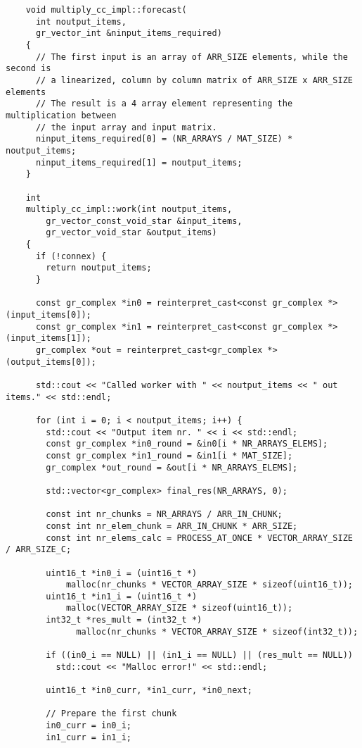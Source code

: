 \begin{lstlisting}
    void multiply_cc_impl::forecast(
      int noutput_items,
      gr_vector_int &ninput_items_required)
    {
      // The first input is an array of ARR_SIZE elements, while the second is
      // a linearized, column by column matrix of ARR_SIZE x ARR_SIZE elements
      // The result is a 4 array element representing the multiplication between
      // the input array and input matrix.
      ninput_items_required[0] = (NR_ARRAYS / MAT_SIZE) * noutput_items;
      ninput_items_required[1] = noutput_items;
    }

    int
    multiply_cc_impl::work(int noutput_items,
        gr_vector_const_void_star &input_items,
        gr_vector_void_star &output_items)
    {
      if (!connex) {
        return noutput_items;
      }

      const gr_complex *in0 = reinterpret_cast<const gr_complex *>(input_items[0]);
      const gr_complex *in1 = reinterpret_cast<const gr_complex *>(input_items[1]);
      gr_complex *out = reinterpret_cast<gr_complex *>(output_items[0]);

      std::cout << "Called worker with " << noutput_items << " out items." << std::endl;

      for (int i = 0; i < noutput_items; i++) {
        std::cout << "Output item nr. " << i << std::endl;
        const gr_complex *in0_round = &in0[i * NR_ARRAYS_ELEMS];
        const gr_complex *in1_round = &in1[i * MAT_SIZE];
        gr_complex *out_round = &out[i * NR_ARRAYS_ELEMS];

        std::vector<gr_complex> final_res(NR_ARRAYS, 0);

        const int nr_chunks = NR_ARRAYS / ARR_IN_CHUNK;
        const int nr_elem_chunk = ARR_IN_CHUNK * ARR_SIZE;
        const int nr_elems_calc = PROCESS_AT_ONCE * VECTOR_ARRAY_SIZE / ARR_SIZE_C;

        uint16_t *in0_i = (uint16_t *)
            malloc(nr_chunks * VECTOR_ARRAY_SIZE * sizeof(uint16_t));
        uint16_t *in1_i = (uint16_t *)
            malloc(VECTOR_ARRAY_SIZE * sizeof(uint16_t));
        int32_t *res_mult = (int32_t *)
              malloc(nr_chunks * VECTOR_ARRAY_SIZE * sizeof(int32_t));

        if ((in0_i == NULL) || (in1_i == NULL) || (res_mult == NULL))
          std::cout << "Malloc error!" << std::endl;

        uint16_t *in0_curr, *in1_curr, *in0_next;

        // Prepare the first chunk
        in0_curr = in0_i;
        in1_curr = in1_i;


\end{lstlisting}

